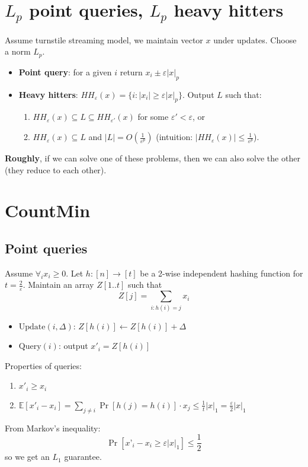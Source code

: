 \documentclass[11pt]{article}
\newcommand{\E}{{\mathbb E}}
\begin{document}
\section{$L_p$ point queries, $L_p$ heavy hitters}
Assume turnstile streaming model, we maintain vector $x$ under updates. Choose a norm $L_p$.
\begin{itemize}
\item \textbf{Point query}: for a given $i$ return $x_i \pm \varepsilon |x|_p$
\item \textbf{Heavy hitters}: $HH_\varepsilon(x) = \{ i: |x_i| \ge \varepsilon |x|_p\}$. Output $L$ such that:
\begin{enumerate}
\item $HH_\varepsilon(x) \subseteq L \subseteq HH_{\varepsilon'}(x)$ for some $\varepsilon' < \varepsilon$, or
\item $HH_\varepsilon(x) \subseteq L$ and $|L| = O(\frac{1}{\varepsilon^p})$ (intuition: $|HH_\varepsilon(x)| \le \frac{1}{\varepsilon^p}$).
\end{enumerate}
\end{itemize}
\begin{observation}
\textbf{Roughly}, if we can solve one of these problems, then we can also solve the other (they reduce to each other).
\end{observation}
\section{CountMin \cite{DBLP:conf/latin/CormodeM04}}
\subsection{Point queries}
Assume $\forall_i x_i \ge 0$. Let $h:[n]\to[t]$ be a 2-wise independent hashing function for $t=\frac{2}{\varepsilon}$. Maintain an array $Z[1..t]$ such that $$Z[j]=\sum_{i: h(i) = j} x_i$$
\begin{itemize}
\item $\text{Update}(i, \Delta)$: $Z[h(i)] \leftarrow Z[h(i)] + \Delta$
\item $\text{Query}(i)$: output $x'_i = Z[h(i)]$
\end{itemize}
Properties of queries:
\begin{enumerate}
\item $x'_i \ge x_i$
\item $\E[x'_i - x_i] = \sum_{j \neq i} \Pr[h(j) = h(i)] \cdot x_j \le \frac{1}{t}|x|_1 = \frac{\varepsilon}{2}|x|_1$
\end{enumerate}
From Markov's inequality: $$\Pr[x’_i - x_i \ge \varepsilon |x|_1] \le \frac{1}{2}$$
so we get an $L_1$ guarantee.
\end{document}
